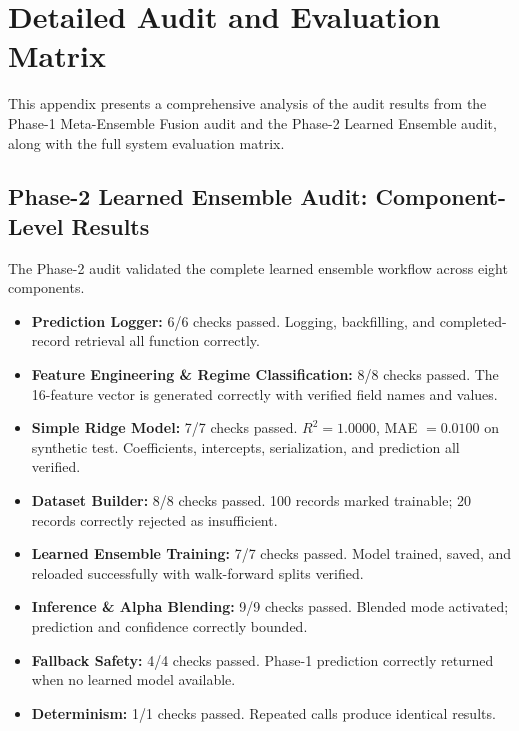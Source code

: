 \documentclass[12pt,a4paper]{report}
\theoremstyle{definition}
\theoremstyle{remark}
\begin{document}
\chapter{Detailed Audit and Evaluation Matrix}
\label{appendix:audit}

This appendix presents a comprehensive analysis of the audit results from the Phase-1 Meta-Ensemble Fusion audit and the Phase-2 Learned Ensemble audit, along with the full system evaluation matrix.

\section{Phase-2 Learned Ensemble Audit: Component-Level Results}

The Phase-2 audit validated the complete learned ensemble workflow across eight components.

\begin{itemize}
    \item \textbf{Prediction Logger:} 6/6 checks passed. Logging, backfilling, and completed-record retrieval all function correctly.
    \item \textbf{Feature Engineering \& Regime Classification:} 8/8 checks passed. The 16-feature vector is generated correctly with verified field names and values.
    \item \textbf{Simple Ridge Model:} 7/7 checks passed. $R^2 = 1.0000$, MAE $= 0.0100$ on synthetic test. Coefficients, intercepts, serialization, and prediction all verified.
    \item \textbf{Dataset Builder:} 8/8 checks passed. 100 records marked trainable; 20 records correctly rejected as insufficient.
    \item \textbf{Learned Ensemble Training:} 7/7 checks passed. Model trained, saved, and reloaded successfully with walk-forward splits verified.
    \item \textbf{Inference \& Alpha Blending:} 9/9 checks passed. Blended mode activated; prediction and confidence correctly bounded.
    \item \textbf{Fallback Safety:} 4/4 checks passed. Phase-1 prediction correctly returned when no learned model available.
    \item \textbf{Determinism:} 1/1 checks passed. Repeated calls produce identical results.
\end{itemize}
\end{document}
